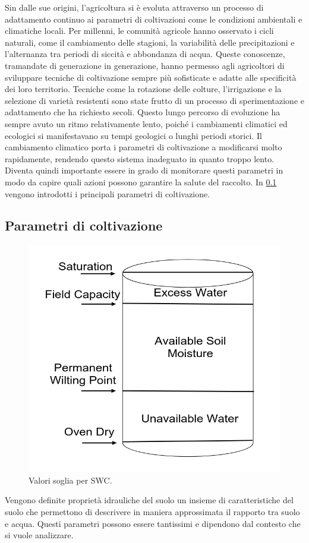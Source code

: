 \documentclass[12pt,a4paper,openright,twoside, openany]{book}
\begin{document}
Sin dalle sue origini, l'agricoltura si è evoluta attraverso un processo di adattamento continuo ai parametri di coltivazioni come le condizioni ambientali e climatiche locali. Per millenni, le comunità agricole hanno osservato i cicli naturali, come il cambiamento delle stagioni, la variabilità delle precipitazioni e l'alternanza tra periodi di siccità e abbondanza di acqua. Queste conoscenze, tramandate di generazione in generazione, hanno permesso agli agricoltori di sviluppare tecniche di coltivazione sempre più sofisticate e adatte alle specificità dei loro territorio. Tecniche come la rotazione delle colture, l'irrigazione e la selezione di varietà resistenti sono state frutto di un processo di sperimentazione e adattamento che ha richiesto secoli.
Questo lungo percorso di evoluzione ha sempre avuto un ritmo relativamente lento, poiché i cambiamenti climatici ed ecologici si manifestavano su tempi geologici o lunghi periodi storici\cite{Janani2024}.
Il cambiamento climatico porta i parametri di coltivazione a modificarsi molto rapidamente, rendendo questo sistema inadeguato in quanto troppo lento. Diventa quindi importante essere in grado di monitorare questi parametri in modo da capire quali azioni possono garantire la salute del raccolto\cite{Monteleone2023}. In \cref{parametri-coltivazione} vengono introdotti i principali parametri di coltivazione.
\newpage
\subsection{Parametri di coltivazione}\label{parametri-coltivazione}

\begin{figure}
    \centering
    \includegraphics[width=0.4\linewidth]{./figures/SWC-costants.png}
    \caption{Valori soglia per SWC\cite{Ding2022}.}
    \label{fig.SWC-costants}
\end{figure}

Vengono definite proprietà idrauliche del suolo un insieme di caratteristiche del suolo che permettono di descrivere in maniera approssimata il rapporto tra suolo e acqua. Questi parametri possono essere tantissimi e dipendono dal contesto che si vuole analizzare.
\end{document}
